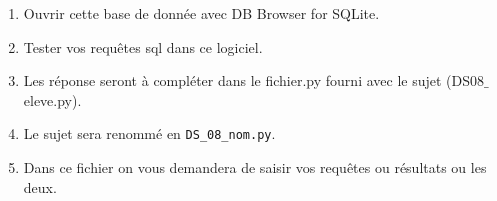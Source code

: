 \begin{enumerate}
\item Ouvrir cette base de donnée avec DB Browser for SQLite.
\item Tester vos requêtes sql dans ce logiciel.
\item Les réponse seront à compléter dans le fichier.py fourni avec le sujet (DS08$\_$eleve.py). 
\item Le sujet sera renommé en \texttt{DS\_08\_nom.py}.
\item Dans ce fichier on vous demandera de saisir vos requêtes ou résultats ou les deux.

\end{enumerate}

